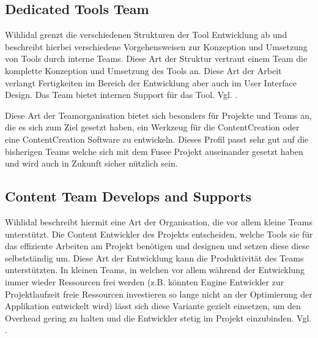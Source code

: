 \documentclass[pagesize, paper=a4, fontsize=12pt, titlepage=true, headings=small, headnosepline, abstractoff, liststotoc, nochapterprefix, plainheadsepline, twoside]{scrreprt}
\begin{document}
\subsection{Dedicated Tools Team}
Wihlidal grenzt die verschiedenen Strukturen der Tool Entwicklung ab und beschreibt hierbei verschiedene Vorgehensweisen zur Konzeption und Umsetzung von Tools durch interne Teams.
Diese Art der Struktur vertraut einem Team die komplette Konzeption und Umsetzung des Tools an. Diese Art der Arbeit verlangt Fertigkeiten im Bereich der Entwicklung aber auch im User Interface Design. Das Team bietet internen Support für das Tool. Vgl. \cite{Wihlidal2006}.

Diese Art der Teamorganisation bietet sich besonders für Projekte und Teams an, die es sich zum Ziel gesetzt haben, ein Werkzeug für die ContentCreation oder eine ContentCreation Software zu entwickeln. Dieses Profil passt sehr gut auf die bisherigen Teams welche sich mit dem Fusee Projekt auseinander gesetzt haben und wird auch in Zukunft sicher nützlich sein.

\subsection{Content Team Develops and Supports}
Wihlidal beschreibt hiermit eine Art der Organisation, die vor allem kleine Teams unterstützt. Die Content Entwickler des Projekts entscheiden, welche Tools sie für das effiziente Arbeiten am Projekt benötigen und designen und setzen diese diese selbstständig um. Diese Art der Entwicklung kann die Produktivität des Teams unterstützten. In kleinen Teams, in welchen vor allem während der Entwicklung immer wieder Ressourcen frei werden (z.B. könnten Engine Entwickler zur Projektlaufzeit freie Ressourcen investieren so lange nicht an der Optimierung der Applikation entwickelt wird) lässt sich diese Variante gezielt einsetzen, um den Overhead gering zu halten und die Entwickler stetig im Projekt einzubinden. Vgl. \cite{Wihlidal2006}.
\end{document}
